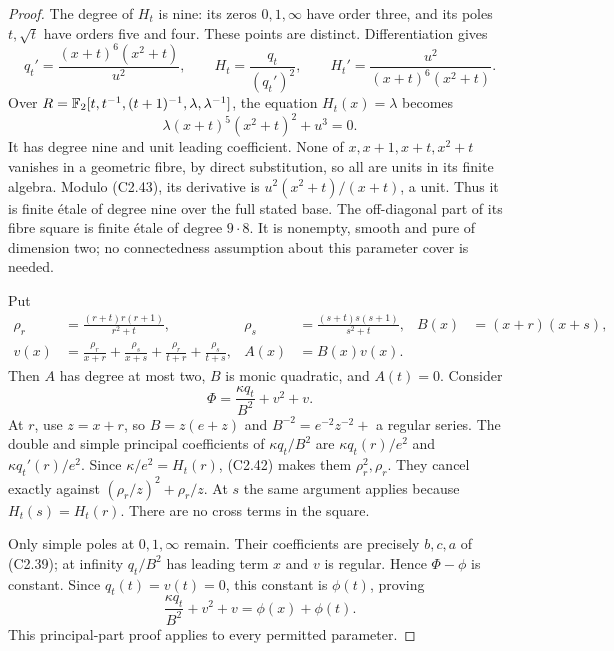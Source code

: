 \begin{proof}
The degree of $H_t$ is nine: its zeros $0,1,\infty$ have
order three, and its poles $t,\sqrt t$ have orders five and four.
These points are distinct. Differentiation gives
\[
 q_t'=\frac{(x+t)^6(x^2+t)}{u^2},\qquad
 H_t=\frac{q_t}{(q_t')^2},\qquad
 H_t'=\frac{u^2}{(x+t)^6(x^2+t)}.                               \tag{C2.42}
\]
Over
$R=\mathbb F_2[t,t^{-1},(t+1)^{-1},\lambda,\lambda^{-1}]$,
the equation $H_t(x)=\lambda$ becomes
\[
                  \lambda(x+t)^5(x^2+t)^2+u^3=0.                \tag{C2.43}
\]
It has degree nine and unit leading coefficient.
None of $x,x+1,x+t,x^2+t$ vanishes in a geometric fibre,
by direct substitution, so all are units in its finite algebra.
Modulo (C2.43), its derivative is
$u^2(x^2+t)/(x+t)$, a unit. Thus it is finite \'etale of
degree nine over the full stated base. The off-diagonal part
of its fibre square is finite \'etale of degree $9\cdot8$.
It is nonempty, smooth and pure of dimension two; no
connectedness assumption about this parameter cover is needed.

Put
\[
 \begin{aligned}
 \rho_r&=\frac{(r+t)r(r+1)}{r^2+t},&
 \rho_s&=\frac{(s+t)s(s+1)}{s^2+t},&
 B(x)&=(x+r)(x+s),\\
 v(x)&=\frac{\rho_r}{x+r}+\frac{\rho_s}{x+s}
       +\frac{\rho_r}{t+r}+\frac{\rho_s}{t+s},&
 A(x)&=B(x)v(x).
 \end{aligned}
\]
Then $A$ has degree at most two, $B$ is monic quadratic,
and $A(t)=0$. Consider
\[
                       \Phi=\frac{\kappa q_t}{B^2}+v^2+v.
\]
At $r$, use $z=x+r$, so $B=z(e+z)$ and
$B^{-2}=e^{-2}z^{-2}+$ a regular series.
The double and simple principal coefficients of
$\kappa q_t/B^2$ are
$\kappa q_t(r)/e^2$ and $\kappa q_t'(r)/e^2$.
Since $\kappa/e^2=H_t(r)$, (C2.42) makes them
$\rho_r^2,\rho_r$. They cancel exactly against
$(\rho_r/z)^2+\rho_r/z$.
At $s$ the same argument applies because $H_t(s)=H_t(r)$.
There are no cross terms in the square.

Only simple poles at $0,1,\infty$ remain.
Their coefficients are precisely $b,c,a$ of (C2.39);
at infinity $q_t/B^2$ has leading term $x$ and $v$ is
regular. Hence $\Phi-\phi$ is constant. Since
$q_t(t)=v(t)=0$, this constant is $\phi(t)$, proving
\[
                    \frac{\kappa q_t}{B^2}+v^2+v
                               =\phi(x)+\phi(t).                \tag{C2.44}
\]
This principal-part proof applies to every permitted parameter.


\end{proof}
